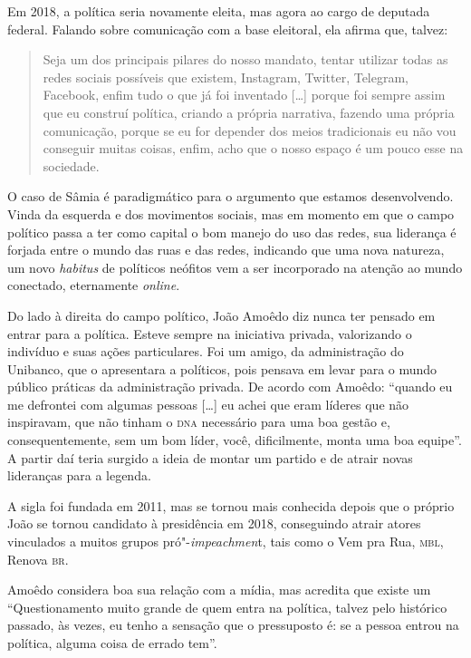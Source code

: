 Em 2018, a política seria novamente eleita, mas agora ao cargo de
deputada federal. Falando sobre comunicação com a base eleitoral, ela
afirma que, talvez:

\begin{quote}
Seja um dos principais pilares do nosso mandato, tentar utilizar todas
as redes sociais possíveis que existem, Instagram, Twitter, Telegram,
Facebook, enfim tudo o que já foi inventado {[}\ldots{}{]} porque foi sempre
assim que eu construí política, criando a própria narrativa, fazendo uma
própria comunicação, porque se eu for depender dos meios tradicionais eu
não vou conseguir muitas coisas, enfim, acho que o nosso espaço é um
pouco esse na sociedade.
\end{quote}

O caso de Sâmia é paradigmático para o argumento que estamos
desenvolvendo. Vinda da esquerda e dos movimentos sociais, mas em
momento em que o campo político passa a ter como capital o bom manejo do
uso das redes, sua liderança é forjada entre o mundo das ruas e das
redes, indicando que uma nova natureza, um novo \emph{habitus} de
políticos neófitos vem a ser incorporado na atenção ao mundo conectado,
eternamente \emph{online}.

Do lado à direita do campo político, João Amoêdo diz nunca ter pensado
em entrar para a política. Esteve sempre na iniciativa privada,
valorizando o indivíduo e suas ações particulares. Foi um amigo, da
administração do Unibanco, que o apresentara a políticos, pois pensava
em levar para o mundo público práticas da administração privada. De
acordo com Amoêdo: ``quando eu me defrontei com algumas pessoas
{[}\ldots{}{]} eu achei que eram líderes que não inspiravam, que não tinham o
\textsc{dna} necessário para uma boa gestão e, consequentemente, sem um bom
líder, você, dificilmente, monta uma boa equipe''. A partir daí teria
surgido a ideia de montar um partido e de atrair novas lideranças para a
legenda.

A sigla foi fundada em 2011, mas se tornou mais conhecida depois que o
próprio João se tornou candidato à presidência em 2018, conseguindo
atrair atores vinculados a muitos grupos pró"-\emph{impeachmen}t, tais
como o Vem pra Rua, \textsc{mbl}, Renova \textsc{br}.

Amoêdo considera boa sua relação com a mídia, mas acredita que existe um
``Questionamento muito grande de quem entra na política, talvez pelo
histórico passado, às vezes, eu tenho a sensação que o pressuposto é: se
a pessoa entrou na política, alguma coisa de errado tem''.

